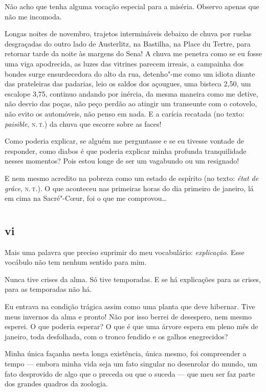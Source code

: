 \noindent{}Não acho que tenha alguma vocação especial para a miséria. Observo
apenas que não me incomoda.

Longas noites de novembro, trajetos intermináveis debaixo de
chuva por ruelas desgraçadas do outro lado de Austerlitz, na Bastilha,
na Place du Tertre, para retornar tarde da noite às margens do Sena! A
chuva me penetra como se eu fosse uma viga apodrecida, as luzes das
vitrines parecem irreais, a campainha dos bondes surge ensurdecedora
do alto da rua, detenho"-me como um idiota diante das prateleiras das
padarias, leio os saldos dos açougues, uma bisteca 2,50, um escalope
3,75, continuo andando por inércia, da mesma maneira como me detive, não
desvio das poças, não peço perdão ao atingir um transeunte com o
cotovelo, não evito os automóveis, não penso em nada. E a carícia
recatada (no texto: \textit{paisible}, \textsc{n.\,t.}) da chuva que escorre sobre as
faces!

Como poderia explicar, se alguém me perguntasse e se eu tivesse
vontade de responder, como diabos é que poderia explicar minha
profunda tranquilidade nesses momentos? Pois estou longe de ser um
vagabundo ou um resignado!

E nem mesmo acredito na pobreza como um estado de espírito (no texto:
\textit{état de grâce}, \textsc{n.\,t.}). O que aconteceu nas primeiras horas do dia
primeiro de janeiro, lá em cima na Sacré"-C\oe ur, foi o que me
comprovou\ldots{}


\chapter*{}
\section{vi}

\noindent{}Mais uma palavra que preciso suprimir do meu vocabulário:
\textit{explicação}. Esse vocábulo não tem nenhum sentido para mim.

Nunca tive crises da alma. Só tive temporadas. E se há explicações para
as crises, para as temporadas não há.

Eu entrava na condição trágica assim como uma planta que deve hibernar.
Tive meus invernos da alma e pronto! Não por isso berrei de
desespero, nem mesmo esperei. O que poderia esperar? O que é que uma
árvore espera em pleno mês de janeiro, toda desfolhada, com o tronco
fendido e os galhos enegrecidos?

Minha única façanha nesta longa existência, única mesmo, foi
compreender a tempo --- embora minha vida seja um fato singular no
desenrolar do mundo, um fato desprovido de algo que o preceda ou que o
suceda --- que meu ser faz parte dos grandes quadros da zoologia.

